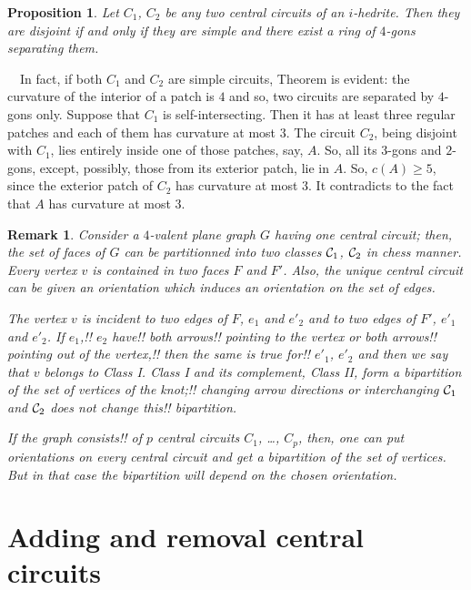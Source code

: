 \documentclass[12pt]{article}
\newtheorem{proposition}{Proposition}
\newtheorem{remark}{Remark}
\newcommand{\proof}{\noindent{\bf Proof.}\ \ }
\begin{document}
\begin{proposition}\label{intersec}
Let $C_1$, $C_2$ be any two central circuits of an $i$-hedrite. Then 
they are disjoint if and only if they are simple and there exist a 
ring of $4$-gons separating them.

\end{proposition}
\proof In fact, if both $C_1$ and $C_2$ are simple circuits, Theorem 
is evident: the curvature of the interior of a patch is $4$ and so, two
circuits are separated by $4$-gons only. Suppose that $C_1$ is 
self-intersecting. Then it has at least three regular patches and each 
of them has curvature at most $3$.
The circuit $C_2$, being disjoint with $C_1$, lies entirely inside one 
of those patches, say, $A$. So, all its $3$-gons and $2$-gons, except, 
possibly, those from its exterior patch, lie in $A$. So, $c(A)\geq 5$,
since the exterior patch of $C_2$ has curvature at most $3$.
It contradicts to the fact that $A$ has curvature at most $3$. 


\begin{remark}
Consider a $4$-valent plane graph $G$ having one central circuit;
then, the set of faces of $G$ can be partitionned into two classes
${\cal C}_1$, ${\cal C}_2$ in chess manner. Every vertex $v$ is 
contained in two faces $F$ and $F'$. Also, the unique central circuit 
can be given an orientation which induces an orientation on the set
of edges.

The vertex $v$ is incident to two edges of $F$, $e_1$ and $e'_2$ 
and to two edges of $F'$, $e'_1$ and $e'_2$. 
If $e_1$,!! $e_2$ 
have!! both arrows!! pointing to the vertex or both arrows!! pointing out 
of the vertex,!! then the same is true for!! $e'_1$, $e'_2$ and then
we say that $v$ {\em belongs to Class I}.
Class I and its complement, Class II, form a bipartition of the
set of vertices of the knot;!! changing arrow directions or 
interchanging ${\cal C}_1$ and ${\cal C}_2$ does not change this!!
bipartition. 

If the graph consists!! of $p$ central circuits $C_1$, \dots, $C_p$,
then, one can put orientations on every central circuit and get
a bipartition of the set of vertices. But in that case the 
bipartition will depend on the chosen orientation.
\end{remark}


\section{Adding and removal central circuits}
\end{document}
